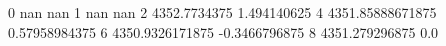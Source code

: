 0 nan nan
1 nan nan
2 4352.7734375 1.494140625
4 4351.85888671875 0.57958984375
6 4350.9326171875 -0.3466796875
8 4351.279296875 0.0
